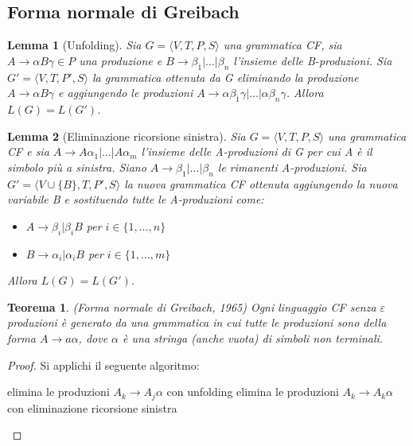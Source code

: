 \documentclass[a4paper,titlepage]{article}
\newtheorem{theorem}{Teorema}[section]
\newtheorem{lemma}{Lemma}[section]
\theoremstyle{definition}
\newcommand{\CFG}{\langle V,T,P,S\rangle}
\begin{document}
\subsection{Forma normale di Greibach}
\begin{lemma}[Unfolding] 
	Sia $G = \CFG$ una grammatica CF, sia $A\to\alpha B\gamma\in P$ una produzione e $B\to\beta_1|\ldots|\beta_n$ l'insieme delle B-produzioni. Sia $G'=\langle V,T,P',S\rangle$ la grammatica ottenuta da G eliminando la produzione $A\to\alpha B\gamma$ e aggiungendo le produzioni $A\to\alpha\beta_1\gamma|\ldots|\alpha\beta_n\gamma$. Allora $L(G)=L(G')$.
\end{lemma}

\begin{lemma}[Eliminazione ricorsione sinistra]
	Sia $G=\CFG$ una grammatica CF e sia $A\to A\alpha_1|\dots|A\alpha_m$ l'insieme delle A-produzioni di G per cui A è il simbolo più a sinistra. Siano $A\to \beta_1|\dots|\beta_n$ le rimanenti A-produzioni. Sia $G'=\langle V\cup\{B\},T,P',S\rangle$ la nuova grammatica CF ottenuta aggiungendo la nuova variabile B e sostituendo tutte le A-produzioni come:\begin{itemize}
		\item $A\to\beta_i|\beta_iB$ per $i\in\{1,\dots,n\}$
		\item $B\to\alpha_i|\alpha_iB$ per $i\in\{1,\dots,m\}$
	\end{itemize}
	Allora $L(G)=L(G')$.
\end{lemma}

\begin{theorem}(Forma normale di Greibach, 1965)
	Ogni linguaggio CF senza $\varepsilon$ produzioni è generato da una grammatica in cui tutte le produzioni sono della forma $A\to a\alpha$, dove $\alpha$ è una stringa (anche vuota) di simboli non terminali.  
\end{theorem}

\begin{proof}
	Si applichi il seguente algoritmo:

	\begin{algorithmic}
				\State elimina le produzioni $A_k\to A_j\alpha$ con unfolding
			\EndFor 
		\State elimina le produzioni $A_k\to A_k\alpha$ con eliminazione ricorsione sinistra
		\EndFor
	\end{algorithmic}
\end{proof}
\end{document}
